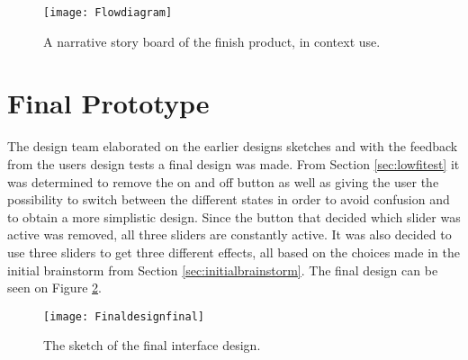 \begin{figure}[!h] 
\centering
\texttt{[image: Flowdiagram]}
\caption{\label{fig:Flowdiagram} A narrative story board of the finish product, in context use.}
\end{figure}

\section{Final Prototype}\label{sec:finaldesign final}
The design team elaborated on the earlier designs sketches and with the feedback from the users design tests a final design was made. From Section \ref{sec:lowfitest} it was determined to remove the on and off button as well as giving the user the possibility to switch between the different states in order to avoid confusion and to obtain a more simplistic design. Since the button that decided which slider was active was removed, all three sliders are constantly active. It was also decided to use three sliders to get three different effects, all based on the choices made in the initial brainstorm from Section \ref{sec:initialbrainstorm}. The final design can be seen on Figure \ref{fig:finaldesignsketch3grey}.

\begin{figure}[!h] 
\centering
\texttt{[image: Finaldesignfinal]}
\caption{\label{fig:finaldesignsketch3grey} The sketch of the final interface design.}
\end{figure}  









